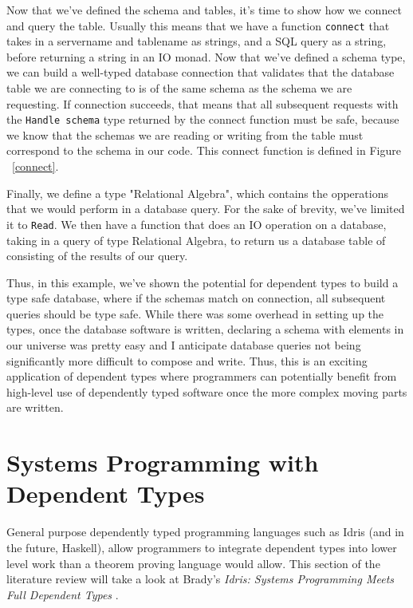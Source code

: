 Now that we've defined the schema and tables, it's time to show how we connect
and query the table. Usually this means that we have a function \texttt{connect}
that takes in a servername and tablename as strings, and a SQL query as a
string, before returning a string in an IO monad. Now that we've defined a
schema type, we can build a well-typed database connection that validates that
the database table we are connecting to is of the same schema as the schema we
are requesting. If connection succeeds, that means that all subsequent requests
with the \texttt{Handle schema} type returned by the connect function must be
safe, because we know that the schemas we are reading or writing from the table
must correspond to the schema in our code. This connect function is defined in
Figure ~\ref{connect}. 

Finally, we define a type "Relational Algebra", which contains the opperations
that we would perform in a database query. For the sake of brevity, we've 
limited it to \texttt{Read}. We then have a function that does an IO operation
on a database, taking in a query of type Relational Algebra, to return us
a database table of consisting of the results of our query. 

Thus, in this example, we've shown the potential for dependent types to build a
type safe database, where if the schemas match on connection, all subsequent
queries should be type safe. While there was some overhead in setting up the
types, once the database software is written, declaring a schema with elements
in our universe was pretty easy and I anticipate database queries not being
significantly more difficult to compose and write. Thus, this is an exciting
application of dependent types where programmers can potentially benefit from
high-level use of dependently typed software once the more complex moving parts
are written. 




\section{Systems Programming with Dependent Types}

General purpose dependently typed programming languages such as Idris (and in
the future, Haskell), allow programmers to integrate dependent types into lower
level work than a theorem proving language would allow. This section of the
literature review will take a look at Brady's \textit{Idris: Systems Programming
Meets Full Dependent Types} \cite{idris_systems_programming}.

